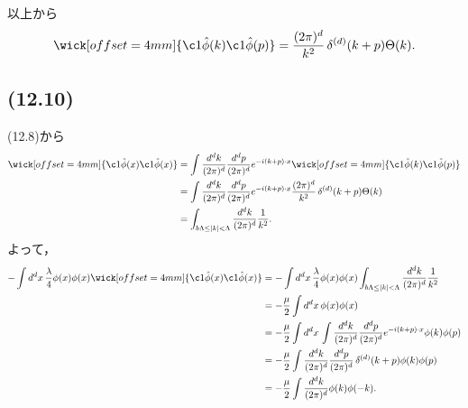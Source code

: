 以上から
\[
\wick[offset=4mm]{ \c1{\hat\phi}(k) \c1{\hat\phi}(p) }
= \frac{(2\pi)^d}{k^2} \mathop{\mathop{\delta^{(d)}}}(k+p) \Theta(k) .
\]

\subsection{(12.10)}
(12.8)から
\begin{align*}
  \wick[offset=4mm]{ \c1{\hat\phi}(x) \c1{\hat\phi}(x) }
  &= \int \frac{d^dk}{(2\pi)^d} \frac{d^dp}{(2\pi)^d} e^{-i(k+p) \cdot x}
  \wick[offset=4mm]{ \c1{\hat\phi}(k) \c1{\hat\phi}(p) } \\
  &= \int \frac{d^dk}{(2\pi)^d} \frac{d^dp}{(2\pi)^d} e^{-i(k+p) \cdot x}
  \frac{(2\pi)^d}{k^2} \mathop{\delta^{(d)}}(k+p) \Theta(k) \\
  &= \int_{b\Lambda \leq \lvert k \rvert < \Lambda} \frac{d^dk}{(2\pi)^d} \frac{1}{k^2} .
\end{align*}
よって，
\begin{align*}
  - \int d^dx \, \frac{\lambda}{4} \phi(x) \phi(x)
  \wick[offset=4mm]{ \c1{\hat\phi}(x) \c1{\hat\phi}(x) }
  &= - \int d^dx \, \frac{\lambda}{4} \phi(x) \phi(x) \int_{b\Lambda \leq \lvert k \rvert < \Lambda} \frac{d^dk}{(2\pi)^d} \frac{1}{k^2} \\
  &= - \frac{\mu}{2} \int d^dx \, \phi(x) \phi(x) \\
  &= - \frac{\mu}{2} \int d^dx \,
  \int \frac{d^dk}{(2\pi)^d} \frac{d^dp}{(2\pi)^d} e^{-i(k+p) \cdot x} \phi(k) \phi(p) \\
  &= - \frac{\mu}{2} \int \frac{d^dk}{(2\pi)^d} \frac{d^dp}{(2\pi)^d} \mathop{\delta^{(d)}}(k+p) \phi(k) \phi(p) \\
  &= - \frac{\mu}{2} \int \frac{d^dk}{(2\pi)^d} \phi(k) \phi(-k) .
\end{align*}

